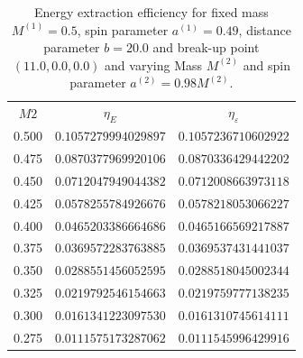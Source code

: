 \begin{table}[]
  \centering
  \begin{tabular}{ccc}
    \hline\hline
    $M2$  & $\eta_E$             & $\eta_\varepsilon$   \\
    0.500 & $0.1057279994029897$ & $0.1057236710602922$ \\
    0.475 & $0.0870377969920106$ & $0.0870336429442202$ \\
    0.450 & $0.0712047949044382$ & $0.0712008663973118$ \\
    0.425 & $0.0578255784926676$ & $0.0578218053066227$ \\
    0.400 & $0.0465203386664686$ & $0.0465166569217887$ \\
    0.375 & $0.0369572283763885$ & $0.0369537431441037$ \\
    0.350 & $0.0288551456052595$ & $0.0288518045002344$ \\
    0.325 & $0.0219792546154663$ & $0.0219759777138235$ \\
    0.300 & $0.0161341223097530$ & $0.0161310745614111$ \\
    0.275 & $0.0111575173287062$ & $0.0111545996429916$ \\ \hline\hline
  \end{tabular}
  \caption{Energy extraction efficiency for fixed mass $M^{(1)} = 0.5$, spin parameter $a^{(1)} = 0.49$, distance parameter $b=20.0$ and break-up point $(11.0, 0.0, 0.0)$ and varying Mass $M^{(2)}$ and spin parameter $a^{(2)} = 0.98 M^{(2)}$.}
  \label{tab:arbitrary_penrose_sks_example_results_M2_variation}
\end{table}